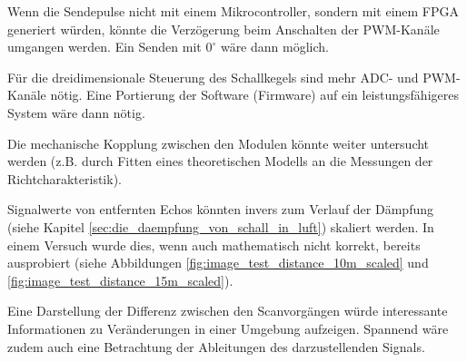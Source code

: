 Wenn die Sendepulse nicht mit einem Mikrocontroller, sondern mit einem FPGA generiert würden, könnte die Verzögerung beim Anschalten der PWM-Kanäle umgangen werden. Ein Senden mit $0^{\circ}$ wäre dann möglich.

Für die dreidimensionale Steuerung des Schallkegels sind mehr ADC- und PWM-Kanäle nötig. Eine Portierung der Software (Firmware) auf ein leistungsfähigeres System wäre dann nötig.

Die mechanische Kopplung zwischen den Modulen könnte weiter untersucht werden (z.B. durch Fitten eines theoretischen Modells an die Messungen der Richtcharakteristik).

Signalwerte von entfernten Echos könnten invers zum Verlauf der Dämpfung (siehe Kapitel \ref{sec:die_daempfung_von_schall_in_luft}) skaliert werden. In einem Versuch wurde dies, wenn auch mathematisch nicht korrekt, bereits ausprobiert (siehe Abbildungen \ref{fig:image_test_distance_10m_scaled} und \ref{fig:image_test_distance_15m_scaled}).

Eine Darstellung der Differenz zwischen den Scanvorgängen würde interessante Informationen zu Veränderungen in einer Umgebung aufzeigen. Spannend wäre zudem auch eine Betrachtung der Ableitungen des darzustellenden Signals.
